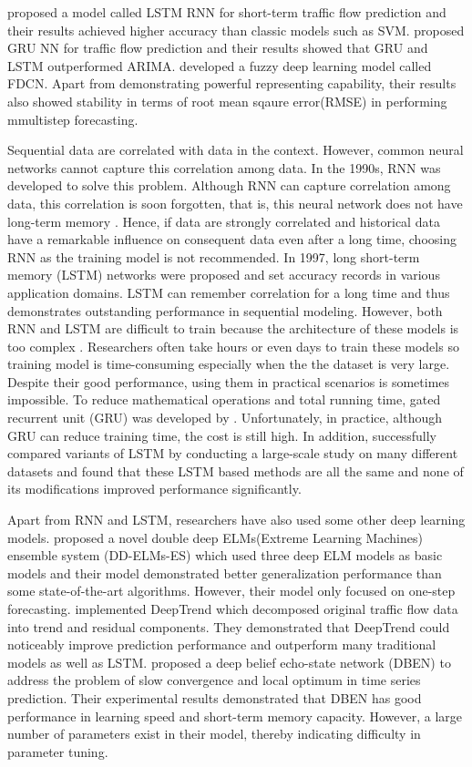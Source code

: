 \documentclass[twocolumn]{article}
\begin{document}
 \citet{LSTMtraffic} proposed a model called LSTM RNN for short-term traffic flow prediction and their results achieved higher accuracy than classic models such as SVM. \citet{gruTraffic} proposed GRU NN for traffic flow prediction and their results showed that GRU and LSTM outperformed ARIMA. \citet{chen2018novel} developed a fuzzy deep learning model called FDCN. Apart from demonstrating powerful representing capability, their results also showed stability in terms of root mean sqaure error(RMSE) in performing mmultistep forecasting. 
\par
Sequential data are correlated with data in the context. However, common neural networks cannot capture this correlation among data. In the 1990s, RNN \citep{RNNraw} was developed to solve this problem. Although RNN can capture correlation among data, this correlation is soon forgotten, that is, this neural network does not have long-term memory \citep{zhao2017lstm,ma2015long}. Hence, if data are strongly correlated and historical data have a remarkable influence on consequent data even after a long time, choosing RNN as the training model is not recommended.
In 1997, long short-term memory (LSTM) networks \citep{LSTM} were proposed and set accuracy records in various application domains. LSTM can remember correlation for a long time and thus demonstrates outstanding performance in sequential modeling.
However, both RNN and LSTM are difficult to train because the architecture of these models is too complex \citep{lei2017training}. Researchers often take hours or even days to train these models so training model is time-consuming especially when the the dataset is very large.  Despite their good performance, using them in practical scenarios is sometimes impossible. 
To reduce mathematical operations and total running time, gated recurrent unit (GRU) was developed by \citet{gruTraffic}. Unfortunately, in practice, although GRU can reduce training time, the cost is still high. In addition, \citet{lstmcomparison} successfully compared variants of LSTM by conducting a large-scale study on many different datasets and found that these LSTM based methods are all the same and none of its modifications improved performance significantly.
\par
Apart from RNN and LSTM, researchers have also used some other deep learning models. \citet{ELM} proposed a novel double deep ELMs(Extreme Learning Machines) ensemble system (DD-ELMs-ES)  which used three deep ELM models as basic models and their model demonstrated better generalization performance than some state-of-the-art algorithms. However, their model only focused on one-step forecasting. \citet{deeptrend} implemented DeepTrend which decomposed original traffic flow data into trend and residual components. They demonstrated that DeepTrend could noticeably improve prediction performance and outperform many traditional models as well as LSTM. \citet{DBEN} proposed a deep belief echo-state network (DBEN) to address the problem of slow convergence and local optimum in time series prediction. Their experimental results demonstrated that DBEN has good performance in learning speed and short-term memory capacity. However, a large number of parameters exist in their model, thereby indicating difficulty in parameter tuning.
\end{document}

